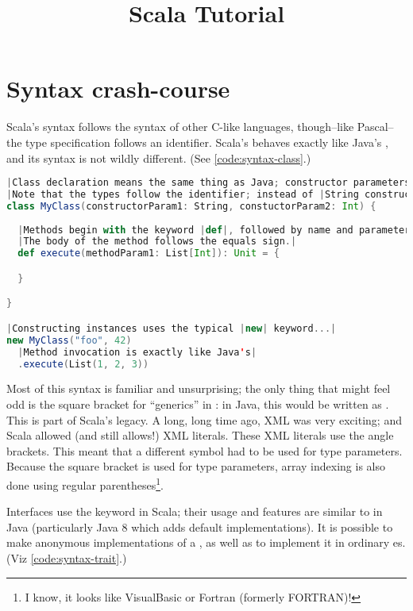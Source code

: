 \documentclass[10 pt]{article}
\title{Scala Tutorial}
\begin{document}
\maketitle
\bigskip

\section{Syntax crash-course}
Scala's syntax follows the syntax of other C-like languages, though--like Pascal--the type specification follows an identifier. Scala's  behaves exactly like Java's , and its syntax is not wildly different. (See \autoref{code:syntax-class}.)

\begin{lstlisting}[caption={Classes and methods}, label={code:syntax-class}, language=Scala, escapechar=|]
|Class declaration means the same thing as Java; constructor parameters are specified in the block immediately following the class name.|
|Note that the types follow the identifier; instead of |String constructorParam1| Scala uses |constructorParam1: String
class MyClass(constructorParam1: String, constuctorParam2: Int) {
  
  |Methods begin with the keyword |def|, followed by name and parameters. The return type follows similar pattern; |Unit| means |void.
  |The body of the method follows the equals sign.|
  def execute(methodParam1: List[Int]): Unit = {

  }

}

|Constructing instances uses the typical |new| keyword...|
new MyClass("foo", 42)
  |Method invocation is exactly like Java's|
  .execute(List(1, 2, 3))
\end{lstlisting}

Most of this syntax is familiar and unsurprising; the only thing that might feel odd is the square bracket for ``generics'' in : in Java, this would be written as . This is part of Scala's legacy. A long, long time ago, XML was very exciting; and Scala allowed (and still allows!) XML literals. These XML literals use the angle brackets. This meant that a different symbol had to be used for type parameters. Because the square bracket is used for type parameters, array indexing is also done using regular parentheses\footnote{I know, it looks like VisualBasic or Fortran (formerly FORTRAN)!}.

Interfaces use the  keyword in Scala; their usage and features are similar to  in Java (particularly Java 8 which adds default implementations). It is possible to make anonymous implementations of a , as well as to implement it in ordinary es. (Viz \autoref{code:syntax-trait}.)
\end{document}
